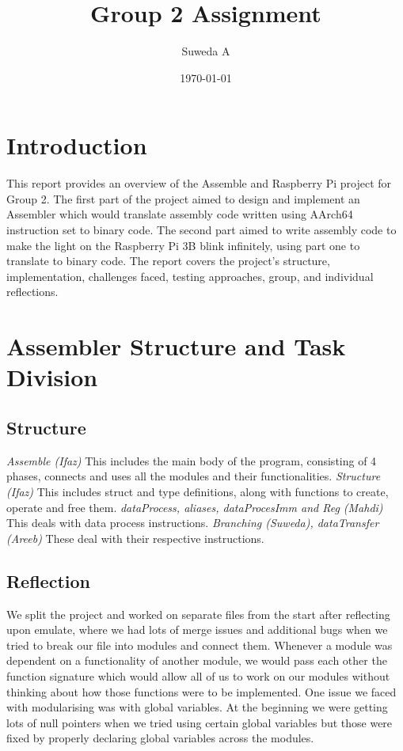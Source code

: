 \documentclass[12pt]{article}
\title{Group 2 Assignment}
\author{Suweda A}
\date{\today}
\begin{document}
\section{Introduction}

This report provides an overview of the Assemble and Raspberry Pi project for Group 2. The first part of the project aimed to design and implement an Assembler which would translate assembly code written using AArch64 instruction set to binary code. The second part aimed to write assembly code to make the light on the Raspberry Pi 3B blink infinitely, using part one to translate to binary code. The report covers the project's structure, implementation, challenges faced, testing approaches, group, and individual reflections. 

\section{Assembler Structure and Task Division}

\subsection{Structure}
\newline
\emph{Assemble (Ifaz)} 
\newline
This includes  the main body of the program, consisting of 4 phases, connects and uses all the modules and their functionalities.
\newline
\newline
\emph{Structure (Ifaz)}
\newline
This includes struct and type definitions, along with functions to create, operate and free them.
\newline
\newline
\emph{dataProcess, aliases, dataProcesImm and Reg (Mahdi)}
\newline
This deals with data process instructions.
\newline
\newline
\emph{Branching (Suweda), dataTransfer (Areeb)}
\newline
These deal with their respective instructions.

\subsection{Reflection}

We split the project and worked on separate files from the start after reflecting upon emulate,  where we had lots of merge issues and additional bugs when we tried to break our file into modules and connect them. Whenever a module was dependent on a functionality of another module, we would pass each other the function signature which would allow all of us to work on our modules without thinking about how those functions were to be implemented.
One issue we faced with modularising was with global variables. At the beginning we were getting lots of null pointers when we tried using certain global variables but those were fixed by properly declaring global variables across the modules.
\end{document}
